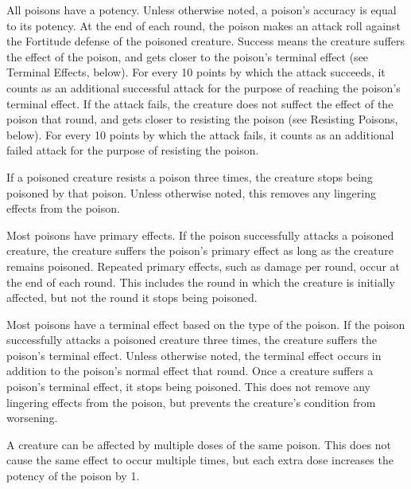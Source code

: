             \label{Potency}\label{Poison Potency}
            All poisons have a potency.
            Unless otherwise noted, a poison's accuracy is equal to its potency.
            At the end of each round, the poison makes an attack roll against the Fortitude defense of the poisoned creature.
            Success means the creature suffers the effect of the poison, and gets closer to the poison's terminal effect (see Terminal Effects, below).
            For every 10 points by which the attack succeeds, it counts as an additional successful attack for the purpose of reaching the poison's terminal effect.
            If the attack fails, the creature does not suffect the effect of the poison that round, and gets closer to resisting the poison (see Resisting Poisons, below).
            For every 10 points by which the attack fails, it counts as an additional failed attack for the purpose of resisting the poison.

            If a poisoned creature resists a poison three times, the creature stops being poisoned by that poison.
            Unless otherwise noted, this removes any lingering effects from the poison.

            Most poisons have primary effects.
            If the poison successfully attacks a poisoned creature, the creature suffers the poison's primary effect as long as the creature remains poisoned.
            Repeated primary effects, such as damage per round, occur at the end of each round.
            This includes the round in which the creature is initially affected, but not the round it stops being poisoned.

            Most poisons have a terminal effect based on the type of the poison.
            If the poison successfully attacks a poisoned creature three times, the creature suffers the poison's terminal effect.
            Unless otherwise noted, the terminal effect occurs in addition to the poison's normal effect that round.
            Once a creature suffers a poison's terminal effect, it stops being poisoned.
            This does not remove any lingering effects from the poison, but prevents the creature's condition from worsening.

            A creature can be affected by multiple doses of the same poison.
            This does not cause the same effect to occur multiple times, but each extra dose increases the potency of the poison by 1.

